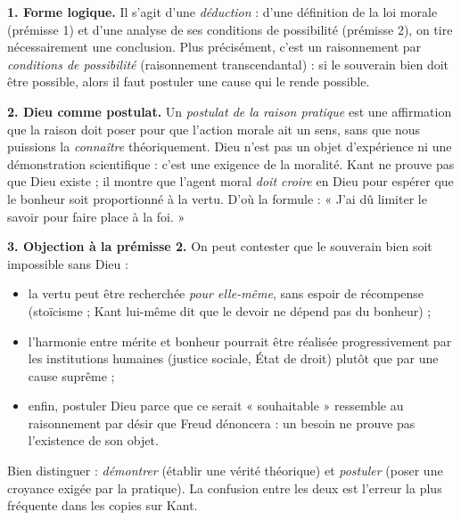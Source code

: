 \documentclass[11pt]{article}
\begin{document}
\begin{corrige}

\textbf{1. Forme logique.} Il s'agit d'une \emph{déduction} : d'une définition de la loi morale (prémisse 1) et d'une analyse de ses conditions de possibilité (prémisse 2), on tire nécessairement une conclusion. Plus précisément, c'est un raisonnement par \emph{conditions de possibilité} (raisonnement transcendantal) : si le souverain bien doit être possible, alors il faut postuler une cause qui le rende possible.

\textbf{2. Dieu comme postulat.} Un \emph{postulat de la raison pratique} est une affirmation que la raison doit poser pour que l'action morale ait un sens, sans que nous puissions la \emph{connaître} théoriquement. Dieu n'est pas un objet d'expérience ni une démonstration scientifique : c'est une exigence de la moralité. Kant ne prouve pas que Dieu existe ; il montre que l'agent moral \emph{doit croire} en Dieu pour espérer que le bonheur soit proportionné à la vertu. D'où la formule : « J'ai dû limiter le savoir pour faire place à la foi. »

\textbf{3. Objection à la prémisse 2.} On peut contester que le souverain bien soit impossible sans Dieu :
\begin{itemize}
\item la vertu peut être recherchée \emph{pour elle-même}, sans espoir de récompense (stoïcisme ; Kant lui-même dit que le devoir ne dépend pas du bonheur) ;
\item l'harmonie entre mérite et bonheur pourrait être réalisée progressivement par les institutions humaines (justice sociale, État de droit) plutôt que par une cause suprême ;
\item enfin, postuler Dieu parce que ce serait « souhaitable » ressemble au raisonnement par désir que Freud dénoncera : un besoin ne prouve pas l'existence de son objet.
\end{itemize}
\end{corrige}
\begin{attention}
Bien distinguer : \emph{démontrer} (établir une vérité théorique) et \emph{postuler} (poser une croyance exigée par la pratique). La confusion entre les deux est l'erreur la plus fréquente dans les copies sur Kant.
\end{attention}
\end{document}
